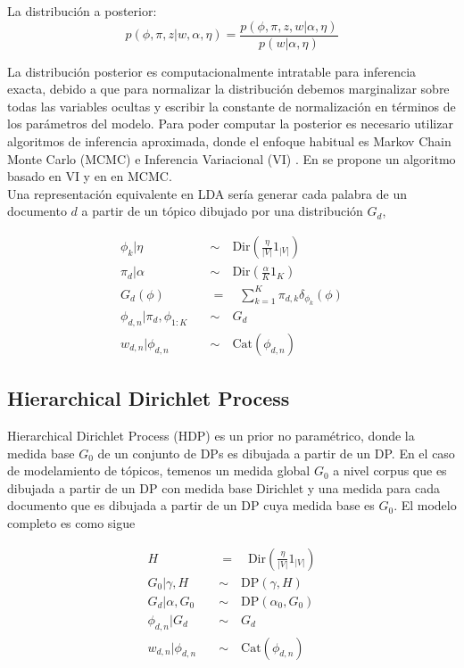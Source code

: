 \documentclass[letterpaper,12pt,oneside]{book} %
\begin{document}
La distribución a posterior:
\begin{equation}
    p(\phi, \pi, z|w, \alpha, \eta) = \frac{p(\phi, \pi, z, w|\alpha, \eta)}{p(w|\alpha, \eta)}
\end{equation}

La distribución posterior es computacionalmente intratable para inferencia exacta, debido a que para normalizar la distribución debemos marginalizar sobre todas las variables ocultas y escribir la constante de normalización en términos de los parámetros del modelo. Para poder computar la posterior es necesario utilizar algoritmos de inferencia aproximada, donde el enfoque habitual es Markov Chain Monte Carlo (MCMC) \citep{andrieu2003introduction} e Inferencia Variacional (VI) \citep{blei2017variational}. En \citep{blei2003latent} se propone un algoritmo basado en VI y en \citep{griffiths2004finding} en MCMC.\\

Una representación equivalente en LDA sería generar cada palabra de un documento $d$ a partir de un tópico dibujado por una distribución $G_{d}$,

\begin{align}
    \phi_{k}|\eta \quad & \sim \quad \text{Dir}(\frac{\eta}{|V|}1_{|V|})\\
    \pi_{d}|\alpha \quad & \sim \quad \text{Dir}(\frac{\alpha}{K}1_{K})\\
    G_{d}(\phi)\quad & = \quad \sum_{k=1}^{K}\pi_{d, k}\delta_{\phi_{k}}(\phi)\\
    \phi_{d,n}|\pi_{d}, \phi_{1:K} \quad & \sim \quad G_{d}\\
    w_{d,n}|\phi_{d,n} \quad & \sim \quad  \text{Cat}(\phi_{d,n})
\end{align}

\subsection{Hierarchical Dirichlet Process}
\label{sec:hdp}

Hierarchical Dirichlet Process (HDP)\citep{teh2005sharing} es un prior no paramétrico, donde la medida base $G_{0}$ de un conjunto de DPs es dibujada a partir de un DP. En el caso de modelamiento de tópicos, temenos un medida global $G_{0}$ a nivel corpus que es dibujada a partir de un DP con medida base Dirichlet y una medida para cada documento que es dibujada a partir de un DP cuya medida base es $G_{0}$. El modelo completo es como sigue

\begin{align}
   H \quad &= \quad \text{Dir}(\frac{\eta}{|V|}1_{|V|})\\
   G_{0}|\gamma, H \quad &\sim \quad \text{DP}(\gamma, H)\\
   G_{d}|\alpha, G_{0} \quad &\sim \quad \text{DP}(\alpha_{0}, G_{0})\\
   \phi_{d,n}|G_{d} \quad &\sim \quad G_{d}\\
   w_{d,n}|\phi_{d,n} \quad &\sim \quad \text{Cat}(\phi_{d,n})
\end{align}
\end{document}
